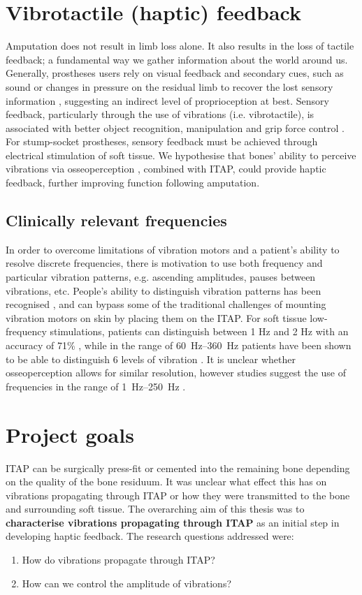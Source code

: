 \section{Vibrotactile (haptic) feedback}
Amputation does not result in limb loss alone. It also results in the loss of tactile feedback; a fundamental way we gather information about the world around us.
Generally, prostheses users rely on visual feedback and secondary cues, such as sound or changes in pressure on the residual limb to recover the lost sensory information \cite{schofield_applications_2014}, suggesting an indirect level of proprioception at best.
Sensory feedback, particularly through the use of vibrations (i.e. vibrotactile), is associated with better object recognition, manipulation and grip force control \cite{schiefer_artificial_2018, rosenbaum-chou_development_2016}.
For stump-socket prostheses, sensory feedback must be achieved through electrical stimulation of soft tissue.
We hypothesise that bones' ability to perceive vibrations via osseoperception \cite{OrgelMarcus2021Oito}, combined with ITAP, could provide haptic feedback, further improving function following amputation.

\subsection{Clinically relevant frequencies}
In order to overcome limitations of vibration motors and a patient's ability to resolve discrete frequencies, there is motivation to use both frequency and particular vibration patterns, e.g. ascending amplitudes, pauses between vibrations, etc.   
People's ability to distinguish vibration patterns has been recognised \cite{ChaubeyPravin2014Cvhf}, and can bypass some of the traditional challenges of mounting vibration motors on skin by placing them on the ITAP. 
For soft tissue low-frequency stimulations, patients can distinguish between 1 Hz and 2 Hz with an accuracy of 71\% \cite{ChaubeyPravin2014Cvhf}, while in the range of \SIrange{60}{360}{Hz} patients have been shown to be able to distinguish 6 levels of vibration \cite{pylatiuk_progress_2004}.
It is unclear whether osseoperception allows for similar resolution, however studies suggest the use of frequencies in the range of \SIrange{1}{250}{Hz} \cite{jacobs_evaluation_2000}.

\section{Project goals}
ITAP can be surgically press-fit or cemented into the remaining bone depending on the quality of the bone residuum.
It was unclear what effect this has on vibrations propagating through ITAP or how they were transmitted to the bone and surrounding soft tissue.
The overarching aim of this thesis was to \textbf{characterise vibrations propagating through ITAP} as an initial step in developing haptic feedback.
The research questions addressed were: \begin{enumerate}
    \item How do vibrations propagate through ITAP?
    \item How can we control the amplitude of vibrations?
\end{enumerate}

